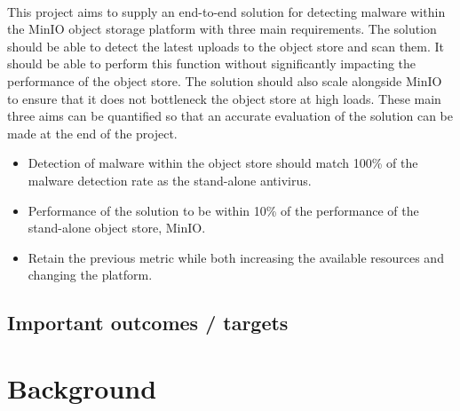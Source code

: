 \documentclass[12pt, conference, final, a4paper, onecolumn, compsoc]{IEEEtran}
\begin{document}
    \paragraph{}
    This project aims to supply an end-to-end solution for detecting malware
    within the MinIO object storage platform with three main requirements. The
    solution should be able to detect the latest uploads to the object store and
    scan them. It should be able to perform this function without significantly
    impacting the performance of the object store. The solution should also
    scale alongside MinIO to ensure that it does not bottleneck the object store
    at high loads. These main three aims can be quantified so that an accurate
    evaluation of the solution can be made at the end of the project.

    \begin{itemize}
      \item Detection of malware within the object store should match 100\%
      of the malware detection rate as the stand-alone antivirus.
      \item Performance of the solution to be within 10\% of the performance of
      the stand-alone object store, MinIO.
      \item Retain the previous metric while both increasing the available
      resources and changing the platform.
    \end{itemize}

    \subsection*{Important outcomes / targets}
    \paragraph{}


    \section{Background}



\end{document}
